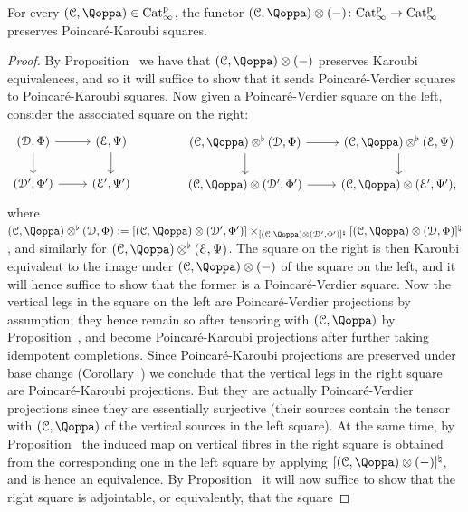 \begin{lemma}
\label{lemma:tensor-preserves-karoubi-squares}%
For every $(\C,\QF) \in \Catp$, the functor $(\C,\QF)\otimes (-)\colon \Catp \to \Catp$ preserves Poincaré-Karoubi squares.
\end{lemma}
\begin{proof}
By Proposition~\;
we have that $(\C,\QF)\otimes (-)$ preserves Karoubi equivalences, and so it will suffice to show that it sends Poincaré-Verdier squares to Poincaré-Karoubi squares. Now given a Poincaré-Verdier square on the left, consider the associated square on the right:
\[
\begin{tikzcd}
(\D,\QFD) \ar[r]\ar[d] & (\E,\QFE) \ar[d] \\
(\D',\QFD') \ar[r] & (\E',\QFE')
\end{tikzcd}
\quad\quad\quad\quad
\begin{tikzcd}
(\C,\QF)\otimes^{\flat}(\D,\QFD) \ar[r]\ar[d] & (\C,\QF)\otimes^{\flat}(\E,\QFE) \ar[d] \\
(\C,\QF)\otimes(\D',\QFD') \ar[r] & (\C,\QF)\otimes(\E',\QFE'),
\end{tikzcd}
\]
where $(\C,\QF)\otimes^{\flat}(\D,\QFD) := [(\C,\QF)\otimes(\D',\QFD')] \times_{[(\C,\QF)\otimes(\D',\QFD')]^{\natural}} [(\C,\QF)\otimes(\D,\QFD)]^{\natural}$, and similarly for $(\C,\QF)\otimes^{\flat}(\E,\QFE)$. The square on the right is then Karoubi equivalent to the image under $(\C,\QF)\otimes (-)$ of the square on the left, and it will hence suffice to show that the former is a Poincaré-Verdier square.
Now the vertical legs in the square on the left are Poincaré-Verdier projections by assumption; they hence remain so after tensoring with $(\C,\QF)$ by Proposition~\;, and become Poincaré-Karoubi projections after further taking idempotent completions. Since Poincaré-Karoubi projections are preserved under base change (Corollary~) we conclude that the vertical legs in the right square are Poincaré-Karoubi projections. But they are actually Poincaré-Verdier projections since they are essentially surjective (their sources contain the tensor with $(\C,\QF)$ of the vertical sources in the left square). At the same time, by Proposition~\; the induced map on vertical fibres in the right square is obtained from the corresponding one in the left square by applying $[(\C,\QF)\otimes (-)]^{\natural}$, and is hence an equivalence. By Proposition~ it will now suffice to show that the right square is adjointable, or equivalently, that the square

\end{proof}
